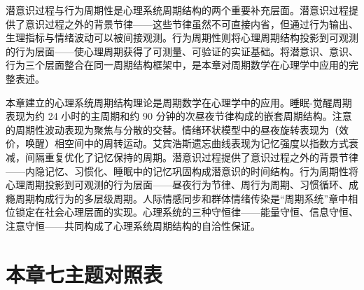 \begin{remark}[潜意识与行为周期在全书中的位置]
潜意识过程与行为周期性是心理系统周期结构的两个重要补充层面。潜意识过程提供了意识过程之外的背景节律——这些节律虽然不可直接内省，但通过行为输出、生理指标与情绪波动可以被间接观测。行为周期性则将心理周期结构投影到可观测的行为层面——使心理周期获得了可测量、可验证的实证基础。将潜意识、意识、行为三个层面整合在同一周期结构框架中，是本章对周期数学在心理学中应用的完整表述。
\end{remark}

\begin{remark}[与全书的衔接]
本章建立的心理系统周期结构理论是周期数学在心理学中的应用。睡眠-觉醒周期表现为约 24 小时的主周期和约 90 分钟的次昼夜节律构成的嵌套周期结构。注意的周期性波动表现为聚焦与分散的交替。情绪环状模型中的昼夜旋转表现为（效价，唤醒）相空间中的周转运动。艾宾浩斯遗忘曲线表现为记忆强度以指数方式衰减，间隔重复优化了记忆保持的周期。潜意识过程提供了意识过程之外的背景节律——内隐记忆、习惯化、睡眠中的记忆巩固构成潜意识的时间结构。行为周期性将心理周期投影到可观测的行为层面——昼夜行为节律、周行为周期、习惯循环、成瘾周期构成行为的多层级周期。人际情感同步和群体情绪传染是“周期系统”章中相位锁定在社会心理层面的实现。心理系统的三种守恒律——能量守恒、信息守恒、注意守恒——共同构成了心理系统周期结构的自洽性保证。
\end{remark}

\section*{本章七主题对照表}

